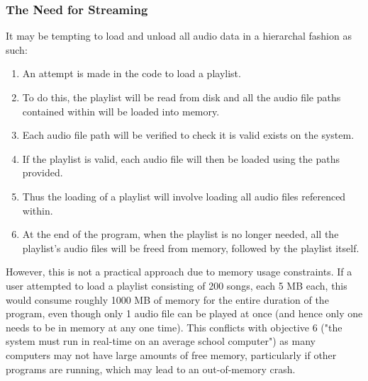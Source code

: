 \subsubsection{The Need for Streaming}
It may be tempting to load and unload all audio data in a hierarchal  fashion as such:
\begin{enumerate}
	\item An attempt is made in the code to load a playlist.
	\item To do this, the playlist will be read from disk and all the audio file paths contained within will be loaded into memory.
	\item Each audio file path will be verified to check it is valid exists on the system.
	\item If the playlist is valid, each audio file will then be loaded using the paths provided.
	\item Thus the loading of a playlist will involve loading all audio files referenced within.
	\item At the end of the program, when the playlist is no longer needed, all the playlist's audio files will be freed from memory, followed by the playlist itself.
\end{enumerate}

However, this is not a practical approach due to memory usage constraints. If a user attempted to load a playlist consisting of 200 songs, each 5 MB each, this would consume roughly 1000 MB of memory for the entire duration of the program, even though only 1 audio file can be played at once (and hence only one needs to be in memory at any one time). This conflicts with objective 6 ("the system must run in real-time on an average school computer") as many computers may not have large amounts of free memory, particularly if other programs are running, which may lead to an out-of-memory crash.

